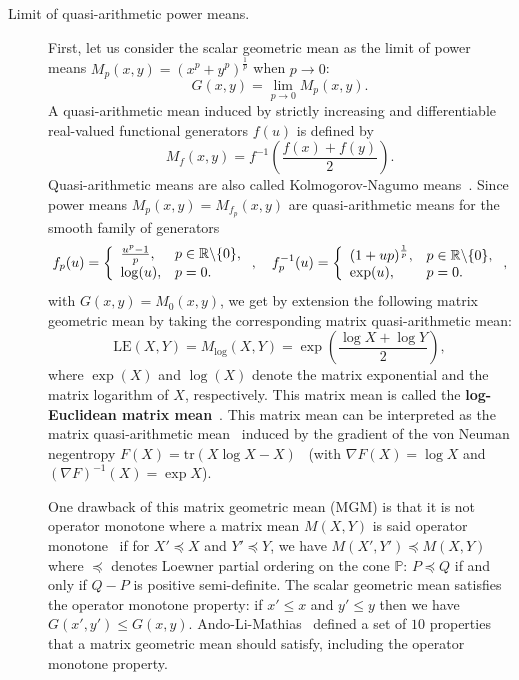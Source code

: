 \documentclass{article}
\def\bbR{\mathbb{R}}
\def\tr{\mathrm{tr}}
\def\LEM{\mathrm{LE}}
\def\bbP{\mathbb{P}}
\begin{document}
\begin{description}
\item[Limit of quasi-arithmetic power means.] First, let us consider the scalar geometric mean as the limit of power means $M_p(x,y)=\left(x^p+y^p\right)^{\frac{1}{p}}$ when $p\rightarrow 0$:
$$
G(x,y)=\lim_{p\rightarrow 0} M_p(x,y).
$$
A quasi-arithmetic mean induced by strictly increasing and differentiable real-valued functional generators $f(u)$ is defined by
$$
M_f(x,y)=f^{-1}\left(\frac{f(x)+f(y)}{2}\right).
$$
Quasi-arithmetic means are also called Kolmogorov-Nagumo means~\cite{Kolmogorov-1930,Nagumo-1930}. 
Since power means $M_p(x,y)=M_{f_p}(x,y)$ are quasi-arithmetic means for the smooth family of generators
$$
f_p(u)=
\left\{
\begin{array}{ll}
\frac{u^p-1}{p}, & p\in\bbR\backslash\{0\},\cr
\log(u), & p=0.
\end{array}
\right., \quad
f_p^{-1}(u)=
\left\{
\begin{array}{ll}
(1+up)^{\frac{1}{p}}, & p\in\bbR\backslash\{0\},\cr
\exp(u), & p=0.
\end{array}
\right.,
$$
with $G(x,y)=M_0(x,y)$, we get by extension the following matrix geometric mean by taking the corresponding matrix quasi-arithmetic mean:
$$
\LEM(X,Y)=M_{\log}(X,Y)=\exp\left(\frac{\log X+\log Y}{2}\right),
$$
where $\exp(X)$ and $\log(X)$ denote the matrix exponential and  the matrix logarithm of $X$, respectively.
This matrix mean is called the {\bf log-Euclidean matrix mean}~\cite{LEMean-2007}.
This matrix mean can be interpreted as the matrix quasi-arithmetic mean~\cite{nielsen2011burbea} induced by the gradient of the von Neuman negentropy $F(X)=\tr(X\log X-X)$~\cite{nielsen2008quantum} (with $\nabla F(X)=\log X$ and $(\nabla F)^{-1}(X)=\exp X$).

One drawback of this matrix geometric mean (MGM) is that it is not operator monotone where
a matrix mean $M(X,Y)$ is said operator monotone~\cite{bhatia2006riemannian} if for $X'\preceq X$ and $Y'\preceq Y$, we have
$M(X',Y')\preceq M(X,Y)$ where $\preceq$ denotes Loewner partial ordering on the cone $\bbP$:
 $P\preceq Q$ if and only if $Q-P$ is positive semi-definite.
The scalar geometric mean satisfies the operator monotone property: if $x'\leq x$ and $y'\leq y$ then we have $G(x',y')\leq G(x,y)$.
Ando-Li-Mathias~\cite{ALM-2004} defined a set of $10$ properties that a matrix geometric mean should satisfy, including the operator monotone property.
	

\end{description}
\end{document}

